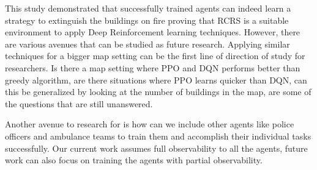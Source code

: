 \documentclass[12pt]{report}
\begin{document}
This study demonstrated that successfully trained agents can indeed learn a strategy to extinguish the buildings on fire proving that RCRS is a suitable environment to apply Deep Reinforcement learning techniques. However, there are various avenues that can be studied as future research. Applying similar techniques for a bigger map setting can be the first line of direction of study for researchers. Is there a map setting where PPO and DQN performs better than greedy algorithm, are there situations where PPO learns quicker than DQN, can this be generalized by looking at the number of buildings in the map, are some of the questions that are still unanswered. 

Another avenue to research for is how can we include other agents like police officers and ambulance teams to train them and accomplish their individual tasks successfully. Our current work assumes full observability to all the agents, future work can also focus on training the agents with partial observability. 




      
\end{document}
